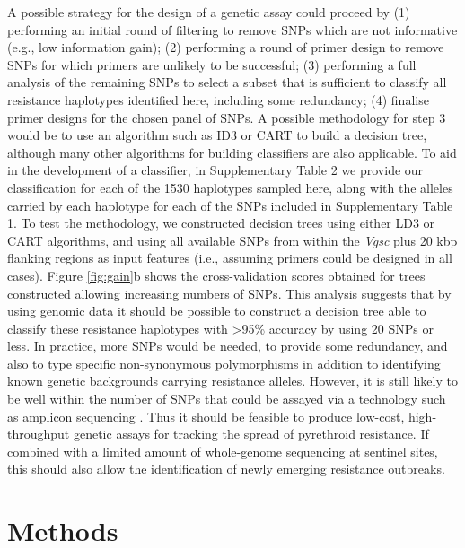 \documentclass[a4paper,11pt,abstracton,hidelinks]{scrartcl}
\begin{document}
%
A possible strategy for the design of a genetic assay could proceed by (1) performing an initial round of filtering to remove SNPs which are not informative (e.g., low information gain); (2) performing a round of primer design to remove SNPs for which primers are unlikely to be successful; (3) performing a full analysis of the remaining SNPs to select a subset that is sufficient to classify all resistance haplotypes identified here, including some redundancy; (4) finalise primer designs for the chosen panel of SNPs.
%
A possible methodology for step 3 would be to use an algorithm such as ID3 \cite{Quinlan1986} or CART \cite{Breiman1984} to build a decision tree, although many other algorithms for building classifiers are also applicable.
%
To aid in the development of a classifier, in Supplementary Table 2 we provide our classification for each of the 1530 haplotypes sampled here, along with the alleles carried by each haplotype for each of the SNPs included in Supplementary Table 1.
%
To test the methodology, we constructed decision trees using either LD3 or CART algorithms, and using all available SNPs from within the \textit{Vgsc} plus 20 kbp flanking regions as input features (i.e., assuming primers could be designed in all cases).
%
Figure \ref{fig:gain}b shows the cross-validation scores obtained for trees constructed allowing increasing numbers of SNPs.
%
This analysis suggests that by using genomic data it should be possible to construct a decision tree able to classify these resistance haplotypes with >95\% accuracy by using 20 SNPs or less.
%
In practice, more SNPs would be needed, to provide some redundancy, and also to type specific non-synonymous polymorphisms in addition to identifying known genetic backgrounds carrying resistance alleles.
%
However, it is still likely to be well within the number of SNPs that could be assayed via a technology such as amplicon sequencing \cite{Kilianski2015}.
%
Thus it should be feasible to produce low-cost, high-throughput genetic assays for tracking the spread of pyrethroid resistance.
%
If combined with a limited amount of whole-genome sequencing at sentinel sites, this should also allow the identification of newly emerging resistance outbreaks.
%



\section*{Methods}
\end{document}
